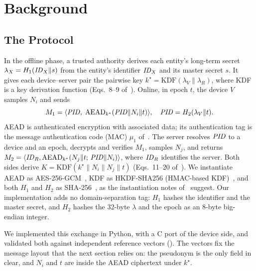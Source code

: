 \section{Background}\label{sec:background}
\subsection{The Protocol}
In the offline phase, a trusted authority derives each entity's long-term secret $\lambda_X=H_1(\mathit{ID}_X\|s)$ from the
entity's identifier $\mathit{ID}_X$ and its master secret $s$. It gives each device--server pair the pairwise key
$k^\star=\mathrm{KDF}(\lambda_V\|\lambda_R)$, where KDF is a key derivation function (Eqs.~8--9 of~\cite{base}). Online,
in epoch $t$, the device $V$ samples $N_i$ and sends
\begin{equation*}
M_1=\langle\mathit{PID},\;\mathrm{AEAD}_{k^\star}(\mathit{PID}\|N_i\|t)\rangle,\quad \mathit{PID}=H_2(\lambda_V\|t).
\end{equation*}
AEAD is authenticated encryption with associated data; its authentication tag is the message authentication code
(MAC) $\mu_1$ of~\cite{base}. The server resolves $\mathit{PID}$ to a device and an epoch, decrypts and verifies $M_1$, samples
$N_j$, and returns $M_2=\langle \mathit{ID}_R,\mathrm{AEAD}_{k^\star}(N_j\|t;\,\mathit{PID}\|N_i)\rangle$, where $\mathit{ID}_R$ identifies the
server. Both sides derive $K=\mathrm{KDF}(k^\star\|N_i\|N_j\|t)$ (Eqs.~11--20 of~\cite{base}). We instantiate AEAD as
AES-256-GCM~\cite{gcm}, KDF as HKDF-SHA256 (HMAC-based KDF)~\cite{hkdf}, and both $H_1$ and $H_2$ as
SHA-256~\cite{fips180}, as the instantiation notes of~\cite{base} suggest. Our implementation adds no domain-separation
tag: $H_1$ hashes the identifier and the master secret, and $H_2$ hashes the 32-byte $\lambda$ and the epoch as an 8-byte
big-endian integer.

We implemented this exchange in Python, with a C port of the device side, and validated both against independent
reference vectors (). The vectors fix the message layout that the next section relies on: the
pseudonym is the only field in clear, and $N_i$ and $t$ are inside the AEAD ciphertext under $k^\star$.

